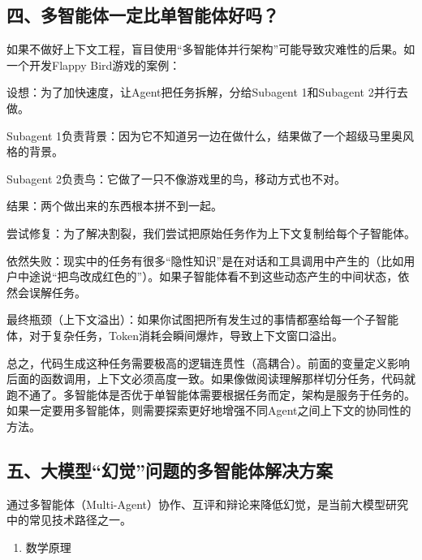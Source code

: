 \hypertarget{ux56dbux591aux667aux80fdux4f53ux4e00ux5b9aux6bd4ux5355ux667aux80fdux4f53ux597dux5417}{%
\subsection{四、多智能体一定比单智能体好吗？}\label{ux56dbux591aux667aux80fdux4f53ux4e00ux5b9aux6bd4ux5355ux667aux80fdux4f53ux597dux5417}}

如果不做好上下文工程，盲目使用``多智能体并行架构''可能导致灾难性的后果。如一个开发Flappy Bird游戏的案例：

设想：为了加快速度，让Agent把任务拆解，分给Subagent 1和Subagent 2并行去做。

Subagent 1负责背景：因为它不知道另一边在做什么，结果做了一个超级马里奥风格的背景。

Subagent 2负责鸟：它做了一只不像游戏里的鸟，移动方式也不对。

结果：两个做出来的东西根本拼不到一起。

尝试修复：为了解决割裂，我们尝试把原始任务作为上下文复制给每个子智能体。

依然失败：现实中的任务有很多``隐性知识''是在对话和工具调用中产生的（比如用户中途说``把鸟改成红色的''）。如果子智能体看不到这些动态产生的中间状态，依然会误解任务。

最终瓶颈（上下文溢出）：如果你试图把所有发生过的事情都塞给每一个子智能体，对于复杂任务，Token消耗会瞬间爆炸，导致上下文窗口溢出。

总之，代码生成这种任务需要极高的逻辑连贯性（高耦合）。前面的变量定义影响后面的函数调用，上下文必须高度一致。如果像做阅读理解那样切分任务，代码就跑不通了。多智能体是否优于单智能体需要根据任务而定，架构是服务于任务的。如果一定要用多智能体，则需要探索更好地增强不同Agent之间上下文的协同性的方法。

\hypertarget{ux4e94ux5927ux6a21ux578bux5e7bux89c9ux95eeux9898ux7684ux591aux667aux80fdux4f53ux89e3ux51b3ux65b9ux6848}{%
\subsection{五、大模型``幻觉''问题的多智能体解决方案}\label{ux4e94ux5927ux6a21ux578bux5e7bux89c9ux95eeux9898ux7684ux591aux667aux80fdux4f53ux89e3ux51b3ux65b9ux6848}}

通过多智能体（Multi-Agent）协作、互评和辩论来降低幻觉，是当前大模型研究中的常见技术路径之一。

\begin{enumerate}
\def\labelenumi{\arabic{enumi}.}
\tightlist
\item
  数学原理
\end{enumerate}

